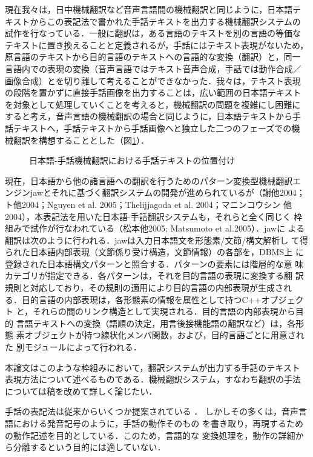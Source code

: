 現在我々は，日中機械翻訳など音声言語間の機械翻訳と同じように，日本語テ
キストからこの表記法で書かれた手話テキストを出力する機械翻訳システムの
試作を行なっている．一般に翻訳は，ある言語のテキストを別の言語の等価な
テキストに置き換えることと定義されるが，手話にはテキスト表現がないため，
原言語のテキストから目的言語のテキストへの言語的な変換（翻訳）と，同一
言語内での表現の変換（音声言語ではテキスト音声合成，手話では動作合成／
画像合成）とを切り離して考えることができなかった．我々は，テキスト表現
の段階を置かずに直接手話画像を出力することは，広い範囲の日本語テキスト
を対象として処理していくことを考えると，機械翻訳の問題を複雑にし困難に
すると考え，音声言語の機械翻訳の場合と同じように，日本語テキストから手
話テキストへ，手話テキストから手話画像へと独立した二つのフェーズでの機
械翻訳を構想することとした（図\ref{fig:sltext}）．

\begin{figure}[tb]
  \centering
  \epsfxsize=11cm
  \caption{日本語-手話機械翻訳における手話テキストの位置付け}
  \label{fig:sltext}
\end{figure}

現在，日本語から他の諸言語への翻訳を行うためのパターン変換型機械翻訳エ
ンジンjawとそれに基づく翻訳システムの開発が進められているが（謝他2004；
ト他2004；Nguyen et al. 2005；Thelijjagoda et al. 2004；マニンコウシン
他2004），本表記法を用いた日本語-手話翻訳システムも，それらと全く同じく
枠組みで試作が行なわれている（松本他2005; Matsumoto et al.2005）．jawに
よる翻訳は次のように行われる．jawは入力日本語文を形態素/文節/構文解析し
て得られた日本語内部表現（文節係り受け構造，文節情報）の各部を，DBMS上
に登録された日本語構文パターンと照合する．パターンの要素には階層的な意
味カテゴリが指定できる．各パターンは，それを目的言語の表現に変換する翻
訳規則と対応しており，その規則の適用により目的言語の内部表現が生成され
る．目的言語の内部表現は，各形態素の情報を属性として持つC++オブジェクト
と，それらの間のリンク構造として実現される．目的言語の内部表現から目的
言語テキストへの変換（語順の決定，用言後接機能語の翻訳など）は，各形態
素オブジェクトが持つ線状化メンバ関数，および，目的言語ごとに用意された
別モジュールによって行われる．
\nocite{Bu2004,Shie2004,Nguyen2005,Thelijjagoda2004,Ngin2004}
\nocite{Matsumoto2005a,Matsumoto2005b}

本論文はこのような枠組みにおいて，翻訳システムが出力する手話のテキスト
表現方法について述べるものである．機械翻訳システム，すなわち翻訳の手法
については稿を改めて詳しく論じたい．

手話の表記法は従来からいくつか提案されている
\cite{Prillwitz2004,Sutton2002,Ichikawa2001,Honna1990}．
しかしその多くは，音声言語における発音記号のように，手話の動作そのもの
を書き取り，再現するための動作記述を目的としている．このため，言語的な
変換処理を，動作の詳細から分離するという目的には適していない．

